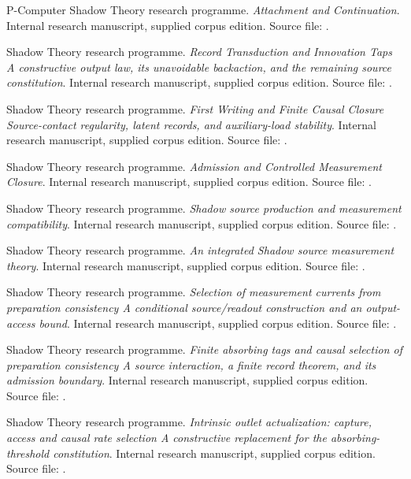 \documentclass[11pt,oneside,openany]{book}
\theoremstyle{definition}
\theoremstyle{remark}\newtheorem{remark}[theorem]{Remark}
\begin{document}
\begin{thebibliography}{P-Computer}
Shadow Theory research programme.
\emph{Attachment and Continuation}.
Internal research manuscript, supplied corpus edition.
Source file: .

Shadow Theory research programme.
\emph{Record Transduction and Innovation Taps A constructive output law, its unavoidable backaction, and the remaining source constitution}.
Internal research manuscript, supplied corpus edition.
Source file: .

Shadow Theory research programme.
\emph{First Writing and Finite Causal Closure Source-contact regularity, latent records, and auxiliary-load stability}.
Internal research manuscript, supplied corpus edition.
Source file: .

Shadow Theory research programme.
\emph{Admission and Controlled Measurement Closure}.
Internal research manuscript, supplied corpus edition.
Source file: .

Shadow Theory research programme.
\emph{Shadow source production and measurement compatibility}.
Internal research manuscript, supplied corpus edition.
Source file: .

Shadow Theory research programme.
\emph{An integrated Shadow source measurement theory}.
Internal research manuscript, supplied corpus edition.
Source file: .

Shadow Theory research programme.
\emph{Selection of measurement currents from preparation consistency A conditional source/readout construction and an output-access bound}.
Internal research manuscript, supplied corpus edition.
Source file: .

Shadow Theory research programme.
\emph{Finite absorbing tags and causal selection of preparation consistency A source interaction, a finite record theorem, and its admission boundary}.
Internal research manuscript, supplied corpus edition.
Source file: .

Shadow Theory research programme.
\emph{Intrinsic outlet actualization: capture, access and causal rate selection A constructive replacement for the absorbing-threshold constitution}.
Internal research manuscript, supplied corpus edition.
Source file: .


\end{thebibliography}
\end{document}
